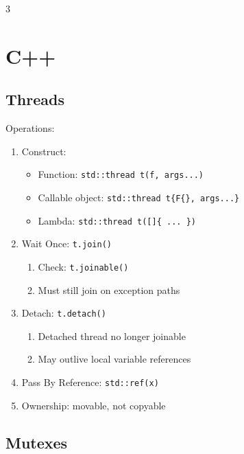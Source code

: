 \documentclass[12pt, a4paper]{article}
\begin{document}
\begin{multicols*}{3}
\section{C++}
\lstset{style=cpp}
\subsection{Threads}

Operations:
\begin{enumerate}[\roman*.]
  \item Construct:
    \begin{itemize}[leftmargin=*]\vspace{3pt}
      \item Function: \lstinline|std::thread t(f, args...)|
      \item Callable object: \lstinline|std::thread t{F{}, args...}|
      \item Lambda: \lstinline|std::thread t([]{ ... })|
    \end{itemize}
  \item Wait Once: \lstinline|t.join()|
    \begin{enumerate}[leftmargin=*, label=$\bullet$]\vspace{3pt}
      \item Check: \lstinline|t.joinable()|
      \item Must still join on exception paths 
    \end{enumerate}
  \item Detach: \lstinline|t.detach()|
    \begin{enumerate}[leftmargin=*, label=$-$]\vspace{3pt}
      \item Detached thread no longer joinable
      \item May outlive local variable references 
    \end{enumerate}
  \item Pass By Reference: \lstinline|std::ref(x)|
  \item Ownership: movable, not copyable
\end{enumerate}

\subsection{Mutexes}


\end{multicols*}
\end{document}
